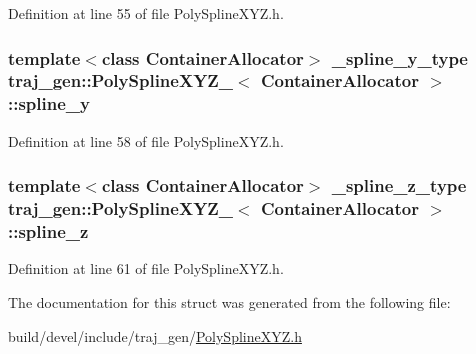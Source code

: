 Definition at line 55 of file Poly\+Spline\+X\+Y\+Z.\+h.

\subsubsection[{\texorpdfstring{spline\+\_\+y}{spline_y}}]{\setlength{\rightskip}{0pt plus 5cm}template$<$class Container\+Allocator$>$ {\bf \+\_\+spline\+\_\+y\+\_\+type} {\bf traj\+\_\+gen\+::\+Poly\+Spline\+X\+Y\+Z\+\_\+}$<$ Container\+Allocator $>$\+::spline\+\_\+y}\hypertarget{structtraj__gen_1_1_poly_spline_x_y_z___a149445d98f325cd01096a829e4ac90d8}{}\label{structtraj__gen_1_1_poly_spline_x_y_z___a149445d98f325cd01096a829e4ac90d8}


Definition at line 58 of file Poly\+Spline\+X\+Y\+Z.\+h.

\subsubsection[{\texorpdfstring{spline\+\_\+z}{spline_z}}]{\setlength{\rightskip}{0pt plus 5cm}template$<$class Container\+Allocator$>$ {\bf \+\_\+spline\+\_\+z\+\_\+type} {\bf traj\+\_\+gen\+::\+Poly\+Spline\+X\+Y\+Z\+\_\+}$<$ Container\+Allocator $>$\+::spline\+\_\+z}\hypertarget{structtraj__gen_1_1_poly_spline_x_y_z___a60e87b9c4f18726568ef29bb43fba580}{}\label{structtraj__gen_1_1_poly_spline_x_y_z___a60e87b9c4f18726568ef29bb43fba580}


Definition at line 61 of file Poly\+Spline\+X\+Y\+Z.\+h.



The documentation for this struct was generated from the following file\+:\begin{DoxyCompactItemize}
\item 
build/devel/include/traj\+\_\+gen/\hyperlink{_poly_spline_x_y_z_8h}{Poly\+Spline\+X\+Y\+Z.\+h}\end{DoxyCompactItemize}
